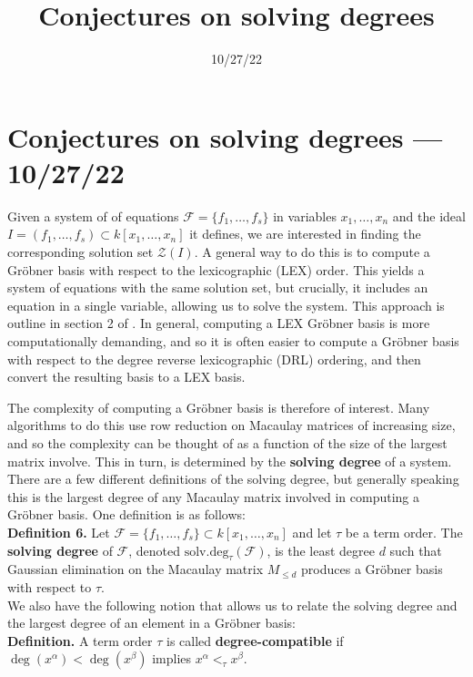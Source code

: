 \documentclass[11pt]{article}
\title{Conjectures on solving degrees}
\date{10/27/22}
\newcommand{\F}{\mathcal{F}}
\newcommand{\sdeg}{\text{solv.deg}}
\begin{document}
\section*{Conjectures on solving degrees --- 10/27/22}

Given a system of of equations $\mathcal{F} = \{f_1, \dots, f_s\}$ in variables $x_1, \dots, x_n$ and the ideal $I = (f_1, \dots, f_s) \subset k[x_1, \dots, x_n]$ it defines, we are interested in finding the corresponding solution set $\mathcal{Z}(I)$. A general way to do this is to compute a Gröbner basis with respect to the lexicographic (LEX) order. This yields a system of equations with the same solution set, but crucially, it includes an equation in a single variable, allowing us to solve the system. This approach is outline in section 2 of \cite{caminata2020solving}. In general, computing a LEX Gröbner basis is more computationally demanding, and so it is often easier to compute a Gröbner basis with respect to the degree reverse lexicographic (DRL) ordering, and then convert the resulting basis to a LEX basis. 

The complexity of computing a Gröbner basis is therefore of interest. Many algorithms to do this use row reduction on Macaulay matrices of increasing size, and so the complexity can be thought of as a function of the size of the largest matrix involve. This in turn, is determined by the \textbf{solving degree} of a system. There are a few different definitions of the solving degree, but generally speaking this is the largest degree of any Macaulay matrix involved in computing a Gröbner basis. One definition is as follows: \\

\noindent \textbf{\cite{caminata2020solving} Definition 6.} Let $\mathcal{F} = \{f_1, \dots, f_s\} \subset k[x_1, \dots, x_n]$ and let $\tau$ be a term order. The \textbf{solving degree} of $\mathcal{F}$, denoted $\sdeg_\tau(\F)$, is the least degree $d$ such that Gaussian elimination on the Macaulay matrix $M_{\leq d}$ produces a Gröbner basis with respect to $\tau$. \\

We also have the following notion that allows us to relate the solving degree and the largest degree of an element in a Gröbner basis: \\

\noindent \textbf{Definition.} A term order $\tau$ is called \textbf{degree-compatible} if $\deg(x^\alpha) < \deg(x^\beta)$ implies $x^\alpha <_\tau x^\beta$. \\
\end{document}
